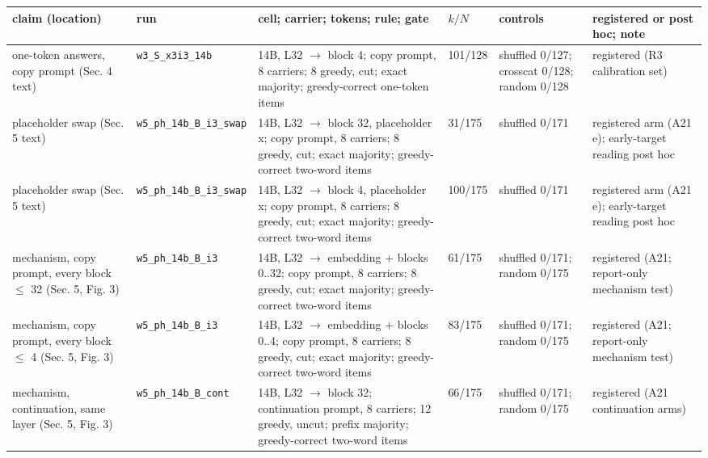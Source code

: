 \begin{table}[t]
\centering
\small
\setlength{\tabcolsep}{1mm}
\begin{tabular}{@{}p{2.5cm}p{2.3cm}p{4.5cm}p{1.3cm}p{3.0cm}p{2.9cm}@{}}
\toprule
claim (location) & run & cell; carrier; tokens; rule; gate & $k/N$ & controls & registered or post hoc; note \\
\midrule
one-token answers, copy prompt (Sec. 4 text) & \texttt{w3\_\allowbreak{{}}S\_\allowbreak{{}}x3i3\_\allowbreak{{}}14b} & 14B, L32 $\to$ block 4; copy prompt, 8 carriers; 8 greedy, cut; exact majority; greedy-correct one-token items & 101/128 & shuffled 0/127; crosscat 0/128; random 0/128 & registered (R3 calibration set) \\
placeholder swap (Sec. 5 text) & \texttt{w5\_\allowbreak{{}}ph\_\allowbreak{{}}14b\_\allowbreak{{}}B\_\allowbreak{{}}i3\_\allowbreak{{}}swap} & 14B, L32 $\to$ block 32, placeholder x; copy prompt, 8 carriers; 8 greedy, cut; exact majority; greedy-correct two-word items & 31/175 & shuffled 0/171 & registered arm (A21 e); early-target reading post hoc \\
placeholder swap (Sec. 5 text) & \texttt{w5\_\allowbreak{{}}ph\_\allowbreak{{}}14b\_\allowbreak{{}}B\_\allowbreak{{}}i3\_\allowbreak{{}}swap} & 14B, L32 $\to$ block 4, placeholder x; copy prompt, 8 carriers; 8 greedy, cut; exact majority; greedy-correct two-word items & 100/175 & shuffled 0/171 & registered arm (A21 e); early-target reading post hoc \\
mechanism, copy prompt, every block $\le$ 32 (Sec. 5, Fig. 3) & \texttt{w5\_\allowbreak{{}}ph\_\allowbreak{{}}14b\_\allowbreak{{}}B\_\allowbreak{{}}i3} & 14B, L32 $\to$ embedding + blocks 0..32; copy prompt, 8 carriers; 8 greedy, cut; exact majority; greedy-correct two-word items & 61/175 & shuffled 0/171; random 0/175 & registered (A21; report-only mechanism test) \\
mechanism, copy prompt, every block $\le$ 4 (Sec. 5, Fig. 3) & \texttt{w5\_\allowbreak{{}}ph\_\allowbreak{{}}14b\_\allowbreak{{}}B\_\allowbreak{{}}i3} & 14B, L32 $\to$ embedding + blocks 0..4; copy prompt, 8 carriers; 8 greedy, cut; exact majority; greedy-correct two-word items & 83/175 & shuffled 0/171; random 0/175 & registered (A21; report-only mechanism test) \\
mechanism, continuation, same layer (Sec. 5, Fig. 3) & \texttt{w5\_\allowbreak{{}}ph\_\allowbreak{{}}14b\_\allowbreak{{}}B\_\allowbreak{{}}cont} & 14B, L32 $\to$ block 32; continuation prompt, 8 carriers; 12 greedy, uncut; prefix majority; greedy-correct two-word items & 66/175 & shuffled 0/171; random 0/175 & registered (A21 continuation arms) \\

\end{tabular}
\end{table}

